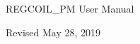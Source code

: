 \begin{center}

\vspace*{1in}

{\Huge REGCOIL\_PM User Manual}

\vspace{2in}


\vspace{1.0in}

Revised May 28, 2019

\end{center}

